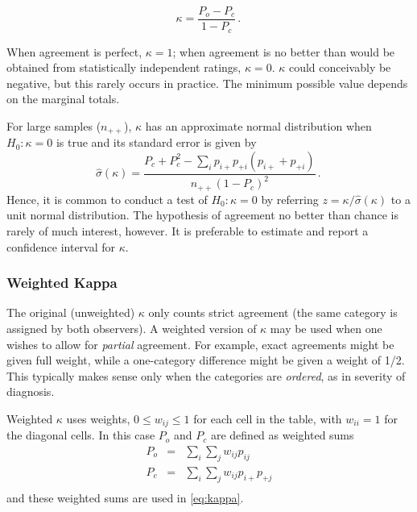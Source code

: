 \documentclass[10pt,krantz2]{krantz}\usepackage[]{graphicx}\usepackage[]{color}
\begin{document}
\begin{equation}\label{eq:kappa}
  \kappa =  \frac{ P_o - P_c } { 1 - P_c }
  \period
\end{equation}

When agreement is perfect, \(\kappa = 1\);  when agreement is no
better than would be obtained from statistically independent ratings,
$\kappa = 0$.
$\kappa$ could conceivably be negative, but this rarely occurs in practice.
The minimum possible value depends on the marginal totals.

For large samples ($n_{++}$), $\kappa$ has an approximate normal
distribution when $H_0 : \kappa = 0$ is true
and its standard error \citep{Fleiss:73,Fleiss-etal:69} is given by
\begin{equation*}
 \hat{\sigma}(\kappa) =  \frac{ P_c + P_c^2 - \sum_i p_{i+} p_{+i} (p_{i+} + p_{+i}) } { n_{++} (1 - P_c)^2 }
 \period
\end{equation*}
Hence, it is common to conduct a test of $H_0 : \kappa = 0$ by
referring $z = \kappa / \hat{\sigma}(\kappa)$
to a unit normal distribution.
The hypothesis of agreement no better than chance is rarely of much
interest, however.  It is preferable to estimate and report a
confidence interval for $\kappa$.

\subsubsection{Weighted Kappa}
The original (unweighted) \(\kappa\) only counts strict agreement (the same
category is assigned by both observers).  A weighted version of
\(\kappa\)
\citep{Cohen:68} may be used when one wishes to allow for \emph{partial} agreement.
For example, exact agreements might be given full weight, while a
one-category difference might be given a weight of 1/2.  This typically makes sense
only when the categories are \emph{ordered}, as in severity of
diagnosis.

Weighted \(\kappa\) uses weights, $0 \le w_{ij} \le 1$ for each cell in the
table, with $w_{ii} =1$ for the diagonal cells.
In this case $P_o$ and $P_c$ are defined as weighted sums
\begin{eqnarray*}
P_o  & = & \sum_i \sum_j w_{ij} p_{ij} \\
P_c  & = & \sum_i \sum_j w_{ij} p_{i+} p_{+j}\\
\end{eqnarray*}
and these weighted sums are used in \eqref{eq:kappa}.
\end{document}
